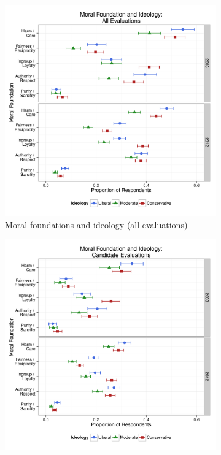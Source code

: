 \documentclass[12pt]{article}
\begin{document}
\begin{figure}[ht]
  \centering
  \caption{INSERT DESCRIPTION}
  \begin{subfigure}[t]{0.49\textwidth}
    \includegraphics[scale=.35]{../calc/fig/appC1prop.pdf}
\caption{Moral foundations and ideology (all evaluations)}\label{fig:appC1prop}
  \end{subfigure}
  \begin{subfigure}[t]{0.49\textwidth}
    \includegraphics[scale=.35]{../calc/fig/appC2cand.pdf}

\end{subfigure}
\end{figure}
\end{document}
